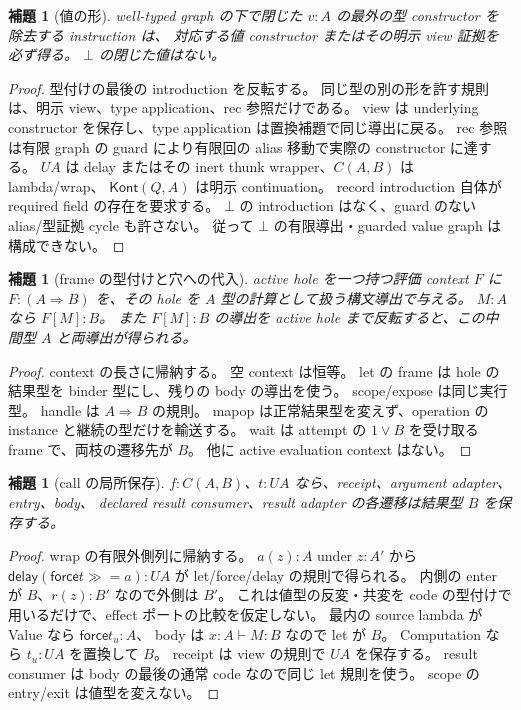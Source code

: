 \documentclass[11pt,a4paper]{article}
\newtheorem{lemma}[definition]{補題}
\newcommand{\Force}{\mathsf{force}}
\newcommand{\Delay}{\mathsf{delay}}
\newcommand{\bind}{\mathbin{\gg=}}
\newcommand{\ty}{\mathrel{\vdash}}
\begin{document}
\begin{lemma}[値の形]
well-typed graph の下で閉じた \(v:A\) の最外の型 constructor を除去する instruction は、
対応する値 constructor またはその明示 view 証拠を必ず得る。
\(\bot\) の閉じた値はない。
\end{lemma}
\begin{proof}
型付けの最後の introduction を反転する。
同じ型の別の形を許す規則は、明示 view、type application、rec 参照だけである。
view は underlying constructor を保存し、type application は置換補題で同じ導出に戻る。
rec 参照は有限 graph の guard により有限回の alias 移動で実際の constructor に達する。
\(UA\) は delay またはその inert thunk wrapper、\(C(A,B)\) は lambda/wrap、
\(\mathsf{Kont}(Q,A)\) は明示 continuation。
record introduction 自体が required field の存在を要求する。
\(\bot\) の introduction はなく、guard のない alias/型証拠 cycle も許さない。
従って \(\bot\) の有限導出・guarded value graph は構成できない。
\end{proof}

\begin{lemma}[frame の型付けと穴への代入]
active hole を一つ持つ評価 context \(F\) に
\(F:(A\Rightarrow B)\) を、その hole を \(A\) 型の計算として扱う構文導出で与える。
\(M:A\) なら \(F[M]:B\)。
また \(F[M]:B\) の導出を active hole まで反転すると、この中間型 \(A\) と両導出が得られる。
\end{lemma}
\begin{proof}
context の長さに帰納する。
空 context は恒等。
let の frame は hole の結果型を binder 型にし、残りの body の導出を使う。
scope/expose は同じ実行型。
handle は \(A\Rightarrow B\) の規則。
mapop は正常結果型を変えず、operation の instance と継続の型だけを輸送する。
wait は attempt の \(1\vee B\) を受け取る frame で、両枝の遷移先が \(B\)。
他に active evaluation context はない。
\end{proof}

\begin{lemma}[call の局所保存]
\(f:C(A,B)\)、\(t:UA\) なら、receipt、argument adapter、entry、body、
declared result consumer、result adapter の各遷移は結果型 \(B\) を保存する。
\end{lemma}
\begin{proof}
wrap の有限外側列に帰納する。
\(a(z):A\) under \(z:A'\) から
\(\Delay(\Force t\bind a):UA\) が let/force/delay の規則で得られる。
内側の enter が \(B\)、\(r(z):B'\) なので外側は \(B'\)。
これは値型の反変・共変を code の型付けで用いるだけで、effect ポートの比較を仮定しない。
最内の source lambda が Value なら \(\Force t_u:A\)、
body は \(x:A\ty M:B\) なので let が \(B\)。
Computation なら \(t_u:UA\) を置換して \(B\)。
receipt は view の規則で \(UA\) を保存する。
result consumer は body の最後の通常 code なので同じ let 規則を使う。
scope の entry/exit は値型を変えない。
\end{proof}
\end{document}
